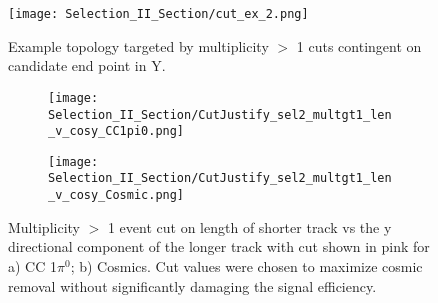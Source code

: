 \begin{figure}[H]
  \centering
  \texttt{[image: Selection\_II\_Section/cut\_ex\_2.png]}
  \caption{ Example topology targeted by multiplicity $>$ 1 cuts contingent on candidate end point in Y. }
\label{fig:cut_ex_2}
\end{figure}

\begin{figure}[H]
\centering
  \begin{subfigure}[t]{0.36\textwidth}
    \centering
\texttt{[image: Selection\_II\_Section/CutJustify\_sel2\_multgt1\_len\_v\_cosy\_CC1pi0.png]}
  \caption{ }
  \end{subfigure} 
  \hspace{10 mm}
  \begin{subfigure}[t]{0.36\textwidth}
    \centering
\texttt{[image: Selection\_II\_Section/CutJustify\_sel2\_multgt1\_len\_v\_cosy\_Cosmic.png]}
  \caption{ }
  \end{subfigure} 
\caption{ Multiplicity $>$ 1 event cut on length of shorter track vs the y directional component of the longer track with cut shown in pink for a) CC 1$\pi^0$; b) Cosmics. Cut values were chosen to maximize cosmic removal without significantly damaging the signal efficiency. }
\label{fig:cutjust_sel2_multgt1_len_v_cosy_sig}
\end{figure}


